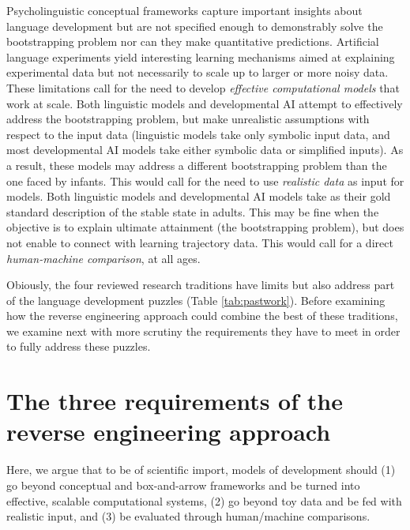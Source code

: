 \documentclass[jou,apacite]{apa6}
\begin{document}
Psycholinguistic conceptual frameworks capture important insights about language development but are not specified enough to demonstrably solve the bootstrapping problem nor can they make quantitative predictions. Artificial language experiments yield interesting learning mechanisms aimed at explaining experimental data but not necessarily to scale up to larger or more noisy data. These limitations call for the need to develop \textit{effective computational models} that work at scale. Both linguistic models and developmental AI attempt to effectively address the bootstrapping problem, but make unrealistic assumptions with respect to the input data (linguistic models take only symbolic input data, and most developmental AI models take either symbolic data or simplified inputs). As a result, these models may address a different bootstrapping problem than the one faced by infants. This would call for the need to use \textit{realistic data} as input for models. Both linguistic models and developmental AI models take as their gold standard description of the stable state in adults. This may be fine when the objective is to explain ultimate attainment (the bootstrapping problem), but does not enable to connect with learning trajectory data. This would call for a direct \textit{human-machine comparison}, at all ages. %

Obiously, the four reviewed research traditions have limits but also address part of the language development puzzles (Table \ref{tab:pastwork}). Before examining how the reverse engineering approach could combine the best of these traditions, we examine next with more scrutiny the requirements they have to meet in order to fully address these puzzles. 



\section{The three requirements of the reverse engineering approach}\label{section:requirements}

Here, we argue that to be of scientific import, models of development should (1) go beyond conceptual and box-and-arrow frameworks and be turned into effective, scalable computational systems, (2) go beyond toy data and be fed with realistic input, and (3) be evaluated through human/machine comparisons.
\end{document}
